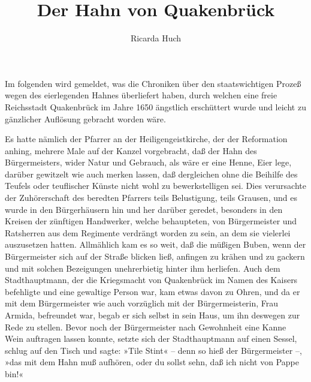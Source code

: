\usepackage[german,ngerman]{babel}
\usepackage[T1]{fontenc}




\raggedbottom

\author{Ricarda Huch}
\title{Der Hahn von Quakenbrück}
\date{}
\lowertitleback{Diese Ausgabe basiert auf dem 
  \href{http://www.gutenberg.net/}{Project Gutenberg}
  EBook \#27446.}

\maketitle

\pagenum{[9]}Im folgenden wird gemeldet, was die Chroniken über
den staatswichtigen Prozeß wegen des eierlegenden Hahnes
überliefert haben, durch welchen eine freie Reichsstadt Quakenbrück
im Jahre 1650 ängstlich erschüttert wurde und leicht zu gänzlicher
Auflösung gebracht worden wäre.

Es hatte nämlich der Pfarrer an der Heiligengeistkirche, der der
Reformation anhing, mehrere Male auf der Kanzel vorgebracht, daß
der Hahn des Bürgermeisters, wider Natur und Gebrauch, als wäre er
eine Henne, Eier lege, darüber gewitzelt wie auch merken lassen,
daß dergleichen ohne die Beihilfe des Teufels oder teuflischer
Künste nicht wohl zu bewerkstelligen sei. Dies verursachte der
Zuhörerschaft des beredten Pfarrers teils Belustigung, teils
Grausen, und es wurde in den Bürgerhäusern hin und her darüber
geredet, besonders in den Kreisen der zünftigen Handwerker, welche
behaupteten, von Bürgermeister und Ratsherren aus dem Regimente
verdrängt worden zu sein, an dem sie vielerlei auszusetzen hatten.
Allmählich kam es so weit, daß die müßigen Buben, wenn der
Bürgermeister sich auf der Straße blicken ließ, anfingen zu krähen
und zu gackern und mit solchen Bezeigungen unehrerbietig hinter ihm
herliefen. Auch dem Stadthauptmann, der die Kriegsmacht von
Quakenbrück im Namen des Kaisers befehligte und eine\pagenum{[10]}
gewaltige Person war, kam etwas davon zu Ohren, und da er mit dem
Bürgermeister wie auch vorzüglich mit der Bürgermeisterin, Frau
Armida, befreundet war, begab er sich selbst in sein Haus, um ihn
deswegen zur Rede zu stellen. Bevor noch der Bürgermeister nach
Gewohnheit eine Kanne Wein auftragen lassen konnte, setzte sich der
Stadthauptmann auf einen Sessel, schlug auf den Tisch und sagte:
»Tile Stint« – denn so hieß der Bürgermeister –, »das mit dem Hahn
muß aufhören, oder du sollst sehn, daß ich nicht von Pappe bin!«

